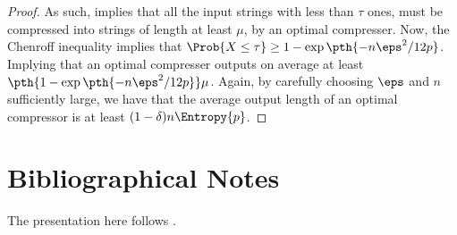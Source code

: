 \begin{proof}
    As such,  implies that all the input strings
    with less than $\tau$ ones, must be compressed into strings of
    length at least $\mu$, by an optimal compresser. Now, the Chenroff
    inequality implies that $\Prob{X \leq \tau } \geq 1- \exp \pth{ -
       n \eps^2 /12p } $. Implying that an optimal compresser outputs
    on average at least $\pth{1- \exp \pth{ - n \eps^2 /12p } }
    \mu$. Again, by carefully choosing $\eps$ and $n$ sufficiently
    large, we have that the average output length of an optimal
    compressor is at least $(1-\delta)n \Entropy{p}$.
\end{proof}



\section{Bibliographical Notes}

The presentation here follows \cite[Sec. 9.1-Sec 9.3]{mu-pcrap-05}.


\ChapterEnd{}

%
